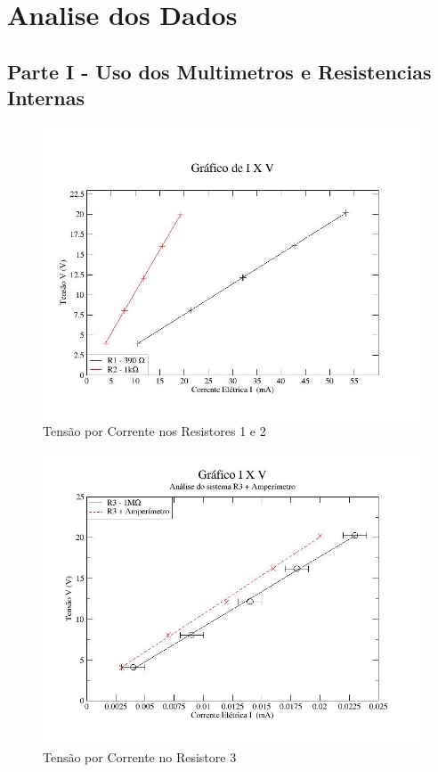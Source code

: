 \documentclass[article]{abntex2}
\begin{document}
\section{Analise dos Dados}
\subsection{Parte I - Uso dos Multimetros e Resistencias Internas}
\begin{figure}[htb]
\begin{center}
\caption{Tensão por Corrente nos Resistores 1 e 2}
\includegraphics[scale=0.7]{grafico1,1.jpg} 
\end{center}
\end{figure}

\newpage

\begin{figure}[htb]
\begin{center}
\caption{Tensão por Corrente no Resistore 3}
\includegraphics[scale=0.7]{grafico1,2.jpg} 
\end{center}
\end{figure}
\end{document}

